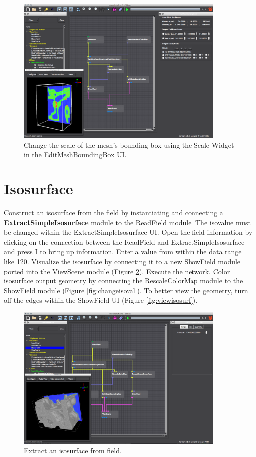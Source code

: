 \documentclass[fleqn,11pt,openany]{book}
\begin{document}
\begin{figure}[H]
\center
\includegraphics[width=0.9\textwidth]{BasicTutorial_figures/editmeshbbox.png}
\caption{Change the scale of the mesh's bounding box using the Scale Widget in the EditMeshBoundingBox UI.}
\label{fig:addbbox2}
\end{figure}

\section{Isosurface}\label{isosurface}

Construct an isosurface from the field by instantiating and connecting a \textbf{ExtractSimpleIsosurface} module to the ReadField module. The isovalue must be changed within the ExtractSimpleIsosurface UI. Open the field information by clicking on the connection between the ReadField and ExtractSimpleIsosurface  and press I to bring up information. Enter a value from within the data range like 120. 
Visualize the isosurface by connecting it to a new ShowField module ported into the ViewScene module (Figure \ref{fig:extract}). 
Execute the network. Color isosurface output geometry by connecting the RescaleColorMap module to the ShowField module (Figure \ref{fig:changeisoval}). To better view the geometry, turn off the edges within the ShowField UI (Figure \ref{fig:viewisosurf}). 

\begin{figure}[H]
\center
\includegraphics[width=0.9\textwidth]{BasicTutorial_figures/extractiso.png}
\caption{Extract an isosurface from field.}
\label{fig:extract}
\end{figure}
\end{document}
